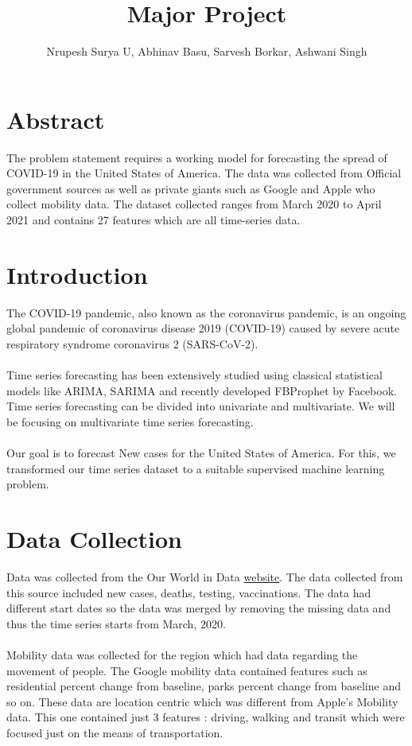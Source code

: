 \documentclass[12pt,a4paper]{article}
\begin{document}
\large
\title{Major Project}
\maketitle
\author{Nrupesh Surya U, Abhinav Basu, Sarvesh Borkar, Ashwani Singh}


\section*{Abstract}
The problem statement requires a working model for forecasting
the spread of COVID-19 in the United States of America. The data was collected from Official government sources 
as well as private giants such as Google and Apple who collect mobility
data. The dataset collected ranges from March 2020 to April 2021 and contains
27 features which are all time-series data.   
\section*{Introduction}
The COVID-19 pandemic, also known as the coronavirus pandemic, is an ongoing global pandemic of coronavirus disease 2019 (COVID-19) caused by severe acute respiratory syndrome coronavirus 2 (SARS-CoV-2).
\\\\
Time series forecasting has been extensively studied using classical 
statistical models like ARIMA, SARIMA and recently developed FBProphet by Facebook.
\\
Time series forecasting can be divided into univariate and multivariate. We will
be focusing on multivariate time series forecasting. 
\\\\
Our goal is to forecast New cases for the United States of America. For this, we transformed our 
time series dataset to a suitable supervised machine learning problem. 

\section*{Data Collection}
Data was collected from the Our World in Data \href{https://ourworldindata.org/coronavirus-source-data}{website}. 
The data collected from this source included new cases, deaths, testing, vaccinations. 
The data had different start dates so the data was merged by removing the missing data and 
thus the time series starts from March, 2020.   
\\\\
Mobility data was collected for the region which had data regarding the movement of people.
The Google mobility data contained features such as residential percent change from baseline,
parks percent change from baseline and so on. These data are location centric which was different
from Apple's Mobility data. This one contained just 3 features : driving, walking and transit which 
were focused just on the means of transportation. 
\end{document}
